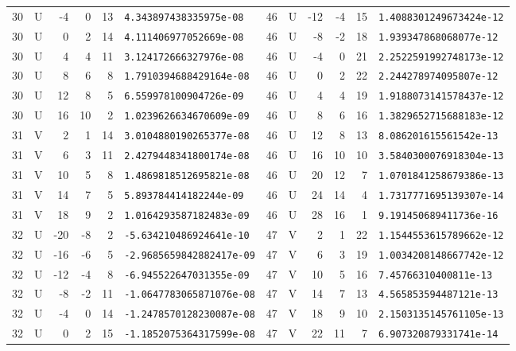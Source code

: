 \begin{longtable}{rcrrrl|rcrrrl}
30 & U & -4 & 0 & 13 & \texttt{4.343897438335975e-08} & 46 & U & -12 & -4 & 15 & \texttt{1.4088301249673424e-12}\\
30 & U & 0 & 2 & 14 & \texttt{4.111406977052669e-08} & 46 & U & -8 & -2 & 18 & \texttt{1.939347868068077e-12}\\
30 & U & 4 & 4 & 11 & \texttt{3.124172666327976e-08} & 46 & U & -4 & 0 & 21 & \texttt{2.2522591992748173e-12}\\
30 & U & 8 & 6 & 8 & \texttt{1.7910394688429164e-08} & 46 & U & 0 & 2 & 22 & \texttt{2.244278974095807e-12}\\
30 & U & 12 & 8 & 5 & \texttt{6.559978100904726e-09} & 46 & U & 4 & 4 & 19 & \texttt{1.9188073141578437e-12}\\
30 & U & 16 & 10 & 2 & \texttt{1.0239626634670609e-09} & 46 & U & 8 & 6 & 16 & \texttt{1.3829652715688183e-12}\\
31 & V & 2 & 1 & 14 & \texttt{3.0104880190265377e-08} & 46 & U & 12 & 8 & 13 & \texttt{8.086201615561542e-13}\\
31 & V & 6 & 3 & 11 & \texttt{2.4279448341800174e-08} & 46 & U & 16 & 10 & 10 & \texttt{3.5840300076918304e-13}\\
31 & V & 10 & 5 & 8 & \texttt{1.4869818512695821e-08} & 46 & U & 20 & 12 & 7 & \texttt{1.0701841258679386e-13}\\
31 & V & 14 & 7 & 5 & \texttt{5.893784414182244e-09} & 46 & U & 24 & 14 & 4 & \texttt{1.7317771695139307e-14}\\
31 & V & 18 & 9 & 2 & \texttt{1.0164293587182483e-09} & 46 & U & 28 & 16 & 1 & \texttt{9.191450689411736e-16}\\
32 & U & -20 & -8 & 2 & \texttt{-5.634210486924641e-10} & 47 & V & 2 & 1 & 22 & \texttt{1.1544553615789662e-12}\\
32 & U & -16 & -6 & 5 & \texttt{-2.9685659842882417e-09} & 47 & V & 6 & 3 & 19 & \texttt{1.0034208148667742e-12}\\
32 & U & -12 & -4 & 8 & \texttt{-6.945522647031355e-09} & 47 & V & 10 & 5 & 16 & \texttt{7.45766310400811e-13}\\
32 & U & -8 & -2 & 11 & \texttt{-1.0647783065871076e-08} & 47 & V & 14 & 7 & 13 & \texttt{4.565853594487121e-13}\\
32 & U & -4 & 0 & 14 & \texttt{-1.2478570128230087e-08} & 47 & V & 18 & 9 & 10 & \texttt{2.1503135145761105e-13}\\
32 & U & 0 & 2 & 15 & \texttt{-1.1852075364317599e-08} & 47 & V & 22 & 11 & 7 & \texttt{6.907320879331741e-14}\\

\end{longtable}
